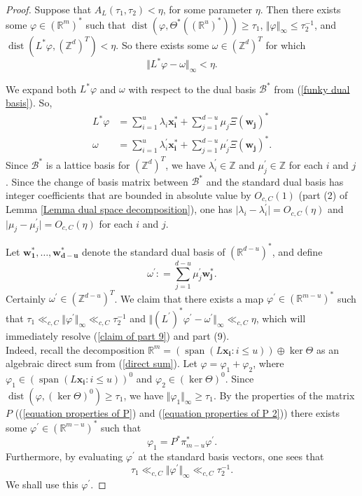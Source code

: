 \documentclass[12pt,a4paper,twoside,reqno]{amsart}
\newcommand{\dist}{\operatorname{dist}}
\newcommand{\spn}{\operatorname{span}}
\numberwithin{equation}{section}
\begin{document}
\begin{proof}
Suppose that $A_L(\tau_1,\tau_2)<\eta$, for some parameter $\eta$. Then there exists some $\varphi\in (\mathbb{R}^m)^*$ such that $\dist(\varphi, \Theta^*((\mathbb{R}^u)^*)) \geqslant \tau_1$, $\Vert \varphi \Vert_\infty \leqslant \tau_2^{-1}$, and $\dist(L^*\varphi, (\mathbb{Z}^d)^T) < \eta$. So there exists some $\omega \in (\mathbb{Z}^d)^T$ for which \[ \Vert L^* \varphi - \omega\Vert_\infty < \eta.\] 

We expand both $L^*\varphi$ and $\omega$ with respect to the dual basis $\mathcal{B}^*$ from (\ref{funky dual basis}). So, 
\begin{align*}
L^*\varphi &= \sum\limits_{i=1}^u \lambda_i \mathbf{x_i^*} + \sum\limits_{j=1}^{d-u} \mu_j \Xi(\mathbf{w_j})^*\\
\omega& = \sum\limits_{i=1}^u \lambda_i^\prime \mathbf{x_i^*} + \sum\limits_{j=1}^{d-u} \mu_j^\prime \Xi(\mathbf{w_j})^*.
\end{align*}
\noindent Since $\mathcal{B}^*$ is a lattice basis for $(\mathbb{Z}^d)^T$, we have $\lambda_i^\prime \in \mathbb{Z}$ and $\mu_j^\prime \in\mathbb{Z}$ for each $i$ and $j$. Since the change of basis matrix between $\mathcal{B}^*$ and the standard dual basis has integer coefficients that are bounded in absolute value by $O_{c,C}(1)$ (part (2) of Lemma \ref{Lemma dual space decomposition}), one has $\vert \lambda_i - \lambda_i^\prime\vert = O_{c,C}(\eta)$ and $\vert \mu_j - \mu_j^\prime\vert = O_{c,C}(\eta)$ for each $i$ and $j$. 

Let $\mathbf{w_1^*}, \dots,\mathbf{w_{d-u}^*}$ denote the standard dual basis of $(\mathbb{R}^{d-u})^*$, and define \[\omega^\prime: = \sum\limits_{j=1}^{d-u} \mu_j^\prime \mathbf{w_j^*}.\] Certainly $\omega^\prime \in (\mathbb{Z}^{d-u})^T$. We claim that there exists a map $\varphi^\prime \in (\mathbb{R}^{m-u})^*$ such that $\tau_1 \ll_{c,C} \Vert \varphi^\prime \Vert_\infty \ll_{c,C} \tau_2^{-1}$ and $\Vert (L^\prime)^* \varphi^\prime - \omega^\prime\Vert_\infty \ll_{c,C} \eta$, which will immediately resolve (\ref{claim of part 9}) and part (9). \\

Indeed, recall the decomposition $\mathbb{R}^m =  (\spn(L\mathbf{x_i}: i\leqslant u)) \oplus \ker \Theta$ as an algebraic direct sum from (\ref{direct sum}). Let $\varphi = \varphi_1 + \varphi_2$, where $\varphi_1 \in(\spn(L\mathbf{x_i}: i\leqslant u))^{0} $ and $\varphi_2 \in (\ker \Theta)^{0}.$ Since $\dist(\varphi, (\ker \Theta)^{0}) \geqslant \tau_1$, we have $\Vert \varphi_1\Vert_\infty \geqslant \tau_1$. By the properties of the matrix $P$ ((\ref{equation properties of P}) and (\ref{equation properties of P 2})) there exists some $\varphi^\prime \in (\mathbb{R}^{m-u})^*$ such that \[\varphi_1 = P^* \pi_{m-u}^* \varphi^\prime.\] Furthermore, by evaluating $\varphi^\prime$ at the standard basis vectors, one sees that \[ \tau_1 \ll_{c,C} \Vert \varphi^\prime \Vert_\infty \ll_{c,C} \tau_2^{-1}.\] We shall use this $\varphi^\prime$.


\end{proof}
\end{document}
